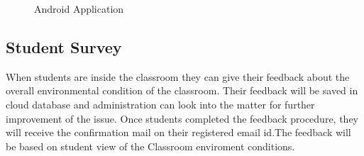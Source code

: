 \begin{figure}
	\hfill
	\centering
	\hfill
	\caption{Android Application}
\end{figure}


\subsection{Student Survey}
When students are inside the classroom they can give their feedback about the overall environmental condition of the classroom. Their feedback will be saved in cloud database and administration can look into the matter for further improvement of the issue. Once students completed the feedback procedure, they will receive the confirmation mail on their registered email id.The feedback will be based on student view of the Classroom enviroment conditions.

